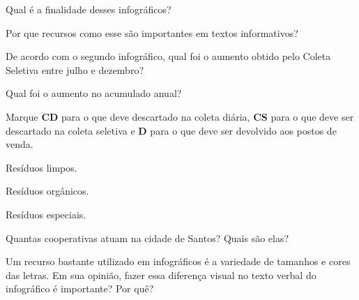 \begin{escolha}
\item Qual é a finalidade desses infográficos?


\item Por que recursos como esse são importantes em textos informativos?


\item De acordo com o segundo infográfico, qual foi o aumento obtido
pelo Coleta Seletiva entre julho e dezembro?


\item Qual foi o aumento no acumulado anual?

\item Marque \textbf{CD} para o que deve descartado na coleta diária,
\textbf{CS} para o que deve ser descartado na coleta seletiva e \textbf{D}
para o que deve ser devolvido aos postos de venda.

\begin{boxlist}
\boxitem[\rosa{CS}] Resíduos limpos.

\boxitem[\rosa{CD}] Resíduos orgânicos.

\boxitem[\rosa{D}] Resíduos especiais.
\end{boxlist}

\item Quantas cooperativas atuam na cidade de Santos? Quais são elas?


\item Um recurso bastante utilizado em infográficos é a variedade de
tamanhos e cores das letras. Em sua opinião, fazer essa diferença visual
no texto verbal do infográfico é importante? Por quê?

\end{escolha}


